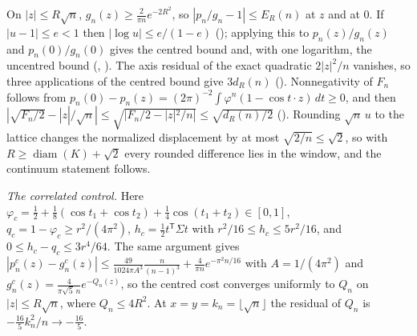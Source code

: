 On $|z|\le R\sqrt n$, $g_n(z)\ge\tfrac2{\pi n}e^{-2R^2}$, so $|p_n/g_n-1|\le E_R(n)$ at $z$ and at $0$.
If $|u-1|\le e<1$ then $|\log u|\le e/(1-e)$ (); applying this to $p_n(z)/g_n(z)$ and $p_n(0)/g_n(0)$ gives the centred bound and, with one logarithm, the uncentred bound (, ).
The axis residual of the exact quadratic $2|z|^2/n$ vanishes, so three applications of the centred bound give $3d_R(n)$ ().
Nonnegativity of $F_n$ follows from $p_n(0)-p_n(z)=(2\pi)^{-2}\int\varphi^n(1-\cos t\cdot z)\,dt\ge0$, and then $|\sqrt{F_n/2}-|z|/\sqrt n|\le\sqrt{|F_n/2-|z|^2/n|}\le\sqrt{d_R(n)/2}$ ().
Rounding $\sqrt n\,u$ to the lattice changes the normalized displacement by at most $\sqrt{2/n}\le\sqrt2$, so with $R\ge\operatorname{diam}(K)+\sqrt2$ every rounded difference lies in the window, and the continuum statement follows.

\emph{The correlated control.}
Here $\varphi_c=\tfrac12+\tfrac18(\cos t_1+\cos t_2)+\tfrac14\cos(t_1+t_2)\in[0,1]$, $q_c=1-\varphi_c\ge r^2/(4\pi^2)$, $h_c=\tfrac12t^{\mathsf T}\Sigma t$ with $r^2/16\le h_c\le5r^2/16$, and $0\le h_c-q_c\le3r^4/64$.
The same argument gives
$|p^c_n(z)-g^c_n(z)|\le\tfrac{49}{1024\pi A^3}\tfrac{n}{(n-1)^3}+\tfrac4{\pi n}e^{-\pi^2n/16}$ with $A=1/(4\pi^2)$ and $g^c_n(z)=\tfrac{4}{\pi\sqrt5\,n}e^{-Q_n(z)}$,
so the centred cost converges uniformly to $Q_n$ on $|z|\le R\sqrt n$, where $Q_n\le4R^2$.
At $x=y=k_n=\lfloor\sqrt n\rfloor$ the residual of $Q_n$ is $-\tfrac{16}5k_n^2/n\to-\tfrac{16}5$.

